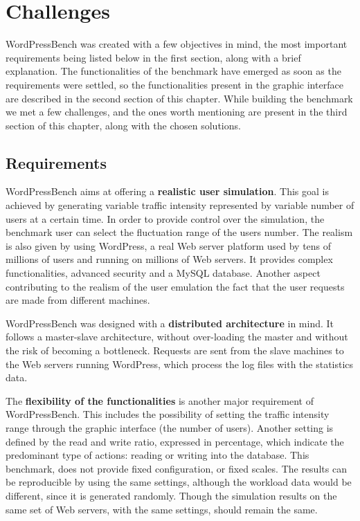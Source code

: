 \chapter{Challenges}
\label{chapter:chapter3}

WordPressBench was created with a few objectives in mind, the most important requirements being listed below in the first section, along with a brief explanation. The functionalities of the benchmark have emerged as soon as the requirements were settled, so the functionalities present in the graphic interface are described in the second section of this chapter. While building the benchmark we met a few challenges, and  the ones worth mentioning are present in the third section of this chapter, along with the chosen solutions.

\section{Requirements}
\label{sec:projectdescription}

WordPressBench aims at offering a \textbf{realistic user simulation}. This goal is achieved by generating variable traffic intensity represented by variable number of users at a certain time. In order to provide control over the simulation, the benchmark user can select the fluctuation range of the users number. The realism is also given by using WordPress, a real Web server platform used by tens of millions of users and running on millions of Web servers. It provides complex functionalities, advanced security and a MySQL database. Another aspect contributing to the realism of the user emulation the fact that the user requests are made from different machines.

WordPressBench was designed with a \textbf{distributed architecture} in mind. It follows a master-slave architecture, without over-loading the master and without the risk of becoming a bottleneck. Requests are sent from the slave machines to the Web servers running WordPress, which process the log files with the statistics data.

The \textbf{flexibility of the functionalities} is another major requirement of WordPressBench. This includes the possibility of setting the traffic intensity range through the graphic interface (the number of users). Another setting is defined by the read and write ratio, expressed in percentage, which indicate the predominant type of actions: reading or writing into the database. This benchmark, does not provide fixed configuration, or fixed scales. The results can be reproducible by using the same settings, although the workload data would be different, since it is generated randomly. Though the simulation results on the same set of Web servers, with the same settings, should remain the same.

